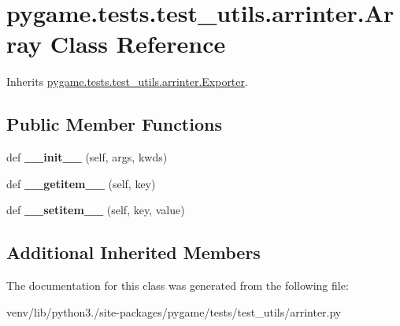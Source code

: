 \hypertarget{classpygame_1_1tests_1_1test__utils_1_1arrinter_1_1_array}{}\section{pygame.\+tests.\+test\+\_\+utils.\+arrinter.\+Array Class Reference}
\label{classpygame_1_1tests_1_1test__utils_1_1arrinter_1_1_array}


Inherits \hyperlink{classpygame_1_1tests_1_1test__utils_1_1arrinter_1_1_exporter}{pygame.\+tests.\+test\+\_\+utils.\+arrinter.\+Exporter}.

\subsection*{Public Member Functions}
\begin{DoxyCompactItemize}
\item 
\mbox{\label{classpygame_1_1tests_1_1test__utils_1_1arrinter_1_1_array_a511974d29123a2def392b0aed5ee5282}} 
def {\bfseries \+\_\+\+\_\+init\+\_\+\+\_\+} (self, args, kwds)
\item 
\mbox{\label{classpygame_1_1tests_1_1test__utils_1_1arrinter_1_1_array_a49cf9362603f44a4ed10e2b01ccca9d6}} 
def {\bfseries \+\_\+\+\_\+getitem\+\_\+\+\_\+} (self, key)
\item 
\mbox{\label{classpygame_1_1tests_1_1test__utils_1_1arrinter_1_1_array_a2166ca8e81ee01032448506982aebdb1}} 
def {\bfseries \+\_\+\+\_\+setitem\+\_\+\+\_\+} (self, key, value)
\end{DoxyCompactItemize}
\subsection*{Additional Inherited Members}


The documentation for this class was generated from the following file\+:\begin{DoxyCompactItemize}
\item 
venv/lib/python3./site-\/packages/pygame/tests/test\+\_\+utils/arrinter.\+py\end{DoxyCompactItemize}
